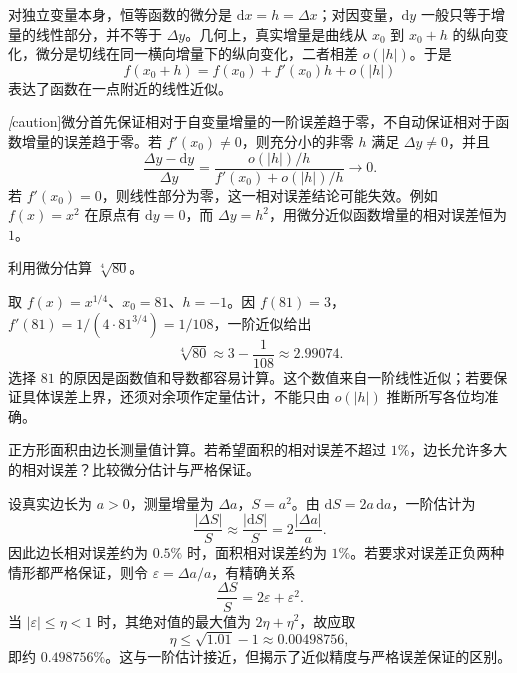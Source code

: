 对独立变量本身，恒等函数的微分是 $\mathrm dx=h=\Delta x$；对因变量，$\mathrm dy$ 一般只等于增量的线性部分，并不等于 $\Delta y$。几何上，真实增量是曲线从 $x_0$ 到 $x_0+h$ 的纵向变化，微分是切线在同一横向增量下的纵向变化，二者相差 $o(|h|)$。于是
\begin{equation}
\label{eq:differential-linear-approximation}
    f(x_0+h)=f(x_0)+f'(x_0)h+o(|h|)
\end{equation}
表达了函数在一点附近的线性近似。

\emph[caution]{微分首先保证相对于自变量增量的一阶误差趋于零，不自动保证相对于函数增量的误差趋于零。}若 $f'(x_0)\ne0$，则充分小的非零 $h$ 满足 $\Delta y\ne0$，并且
\[
    \frac{\Delta y-\mathrm dy}{\Delta y}
    =\frac{o(|h|)/h}{f'(x_0)+o(|h|)/h}\longrightarrow0.
\]
若 $f'(x_0)=0$，则线性部分为零，这一相对误差结论可能失效。例如 $f(x)=x^2$ 在原点有 $\mathrm dy=0$，而 $\Delta y=h^2$，用微分近似函数增量的相对误差恒为 $1$。

\begin{example}
\label{ex:fourth-root-linear-approximation}
利用微分估算 $\sqrt[4]{80}$。
\end{example}
\begin{solve}
取 $f(x)=x^{1/4}$、$x_0=81$、$h=-1$。因 $f(81)=3$，$f'(81)=1/(4\cdot81^{3/4})=1/108$，一阶近似给出
\[
    \sqrt[4]{80}\approx3-\frac1{108}\approx2.99074.
\]
选择 $81$ 的原因是函数值和导数都容易计算。这个数值来自一阶线性近似；若要保证具体误差上界，还须对余项作定量估计，不能只由 $o(|h|)$ 推断所写各位均准确。
\end{solve}

\begin{example}
\label{ex:square-area-relative-error-differential}
正方形面积由边长测量值计算。若希望面积的相对误差不超过 $1\%$，边长允许多大的相对误差？比较微分估计与严格保证。
\end{example}
\begin{solve}
设真实边长为 $a>0$，测量增量为 $\Delta a$，$S=a^2$。由 $\mathrm dS=2a\,\mathrm da$，一阶估计为
\[
    \frac{|\Delta S|}{S}\approx\frac{|\mathrm dS|}{S}
    =2\frac{|\Delta a|}a.
\]
因此边长相对误差约为 $0.5\%$ 时，面积相对误差约为 $1\%$。若要求对误差正负两种情形都严格保证，则令 $\varepsilon=\Delta a/a$，有精确关系
\[
    \frac{\Delta S}{S}=2\varepsilon+\varepsilon^2.
\]
当 $|\varepsilon|\leq\eta<1$ 时，其绝对值的最大值为 $2\eta+\eta^2$，故应取
\[
    \eta\leq\sqrt{1.01}-1\approx0.00498756,
\]
即约 $0.498756\%$。这与一阶估计接近，但揭示了近似精度与严格误差保证的区别。
\end{solve}

